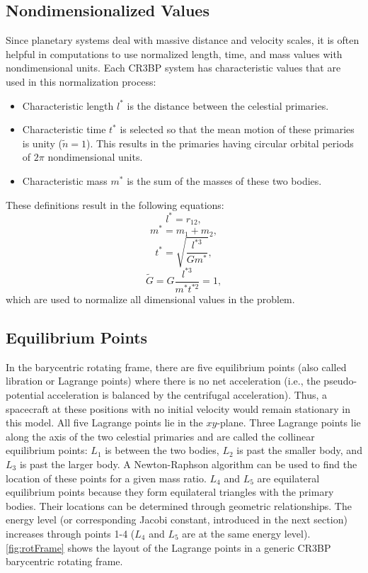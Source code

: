 \subsection{Nondimensionalized Values}
Since planetary systems deal with massive distance and velocity scales, it is often helpful in
computations to use normalized length, time, and mass values with nondimensional units. Each CR3BP
system has characteristic values that are used in this normalization process:
\begin{itemize}
    \item Characteristic length $l^{*}$ is the distance between the celestial primaries.
    \item Characteristic time $t^{*}$ is selected so that the mean motion of these primaries is
    unity ($\tilde{n}=1$). This results in the primaries having circular orbital periods of $2\pi$
    nondimensional units.
    \item Characteristic mass $m^{*}$ is the sum of the masses of these two bodies.
\end{itemize}
These definitions result in the following equations:
\begin{equation}
    l^{*}=r_{12},
    \label{eq:lstar}
\end{equation}
\begin{equation}
    m^{*}=m_{1}+m_{2},
    \label{eq:mstar}
\end{equation}
\begin{equation}
    t^{*}=\sqrt{\frac{l^{*3}}{Gm^{*}}},
    \label{eq:tstar}
\end{equation}
\begin{equation}
    \tilde{G}=G\frac{l^{*3}}{m^{*}t^{*2}}=1,
    \label{eq:gstar}
\end{equation}
which are used to normalize all dimensional values in the problem.

\subsection{Equilibrium Points}
In the barycentric rotating frame, there are five equilibrium points (also called libration or
Lagrange points) where there is no net acceleration (i.e., the pseudo-potential acceleration is
balanced by the centrifugal acceleration). Thus, a spacecraft at these positions with no initial
velocity would remain stationary in this model. All five Lagrange points lie in the $xy$-plane.
Three Lagrange points lie along the axis of the two celestial primaries and are called the
collinear equilibrium points: $L_{1}$ is between the two bodies, $L_{2}$ is past the smaller body,
and $L_{3}$ is past the larger body. A Newton-Raphson algorithm can be used to find the location of
these points for a given mass ratio. $L_{4}$ and $L_{5}$ are equilateral equilibrium points because
they form equilateral triangles with the primary bodies. Their locations can be determined through
geometric relationships. The energy level (or corresponding Jacobi constant, introduced in the next
section) increases through points 1-4 ($L_{4}$ and $L_{5}$ are at the same energy level).
\cref{fig:rotFrame} shows the layout of the Lagrange points in a generic CR3BP barycentric rotating
frame.

